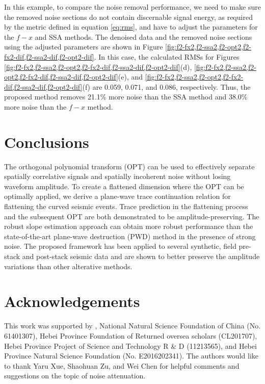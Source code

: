 In this example, to compare the noise removal performance, we need to make sure the removed noise sections do not contain discernable signal energy, as required by the metric defined in equation \ref{eq:rms}, and have to adjust the parameters for the $f-x$ and SSA methods. The denoised data and the removed noise sections using the adjusted parameters are shown in Figure \ref{fig:f2-fx2,f2-ssa2,f2-opt2,f2-fx2-dif,f2-ssa2-dif,f2-opt2-dif}. In this case, the calculated RMSs for Figures \ref{fig:f2-fx2,f2-ssa2,f2-opt2,f2-fx2-dif,f2-ssa2-dif,f2-opt2-dif}(d), \ref{fig:f2-fx2,f2-ssa2,f2-opt2,f2-fx2-dif,f2-ssa2-dif,f2-opt2-dif}(e), and \ref{fig:f2-fx2,f2-ssa2,f2-opt2,f2-fx2-dif,f2-ssa2-dif,f2-opt2-dif}(f) are 0.059, 0.071, and 0.086, respectively. Thus, the proposed method removes 21.1\% more noise than the SSA method and 38.0\% more noise than the $f-x$ method.

\section{Conclusions}
The orthogonal polynomial transform (OPT) can be used to effectively separate spatially correlative signals and spatially incoherent noise without losing waveform amplitude. To create a flattened dimension where the OPT can be optimally applied, we derive a plane-wave trace continuation relation for flattening the curved seismic events. Trace prediction in the flattening process and the subsequent OPT are both demonstrated to be amplitude-preserving. The robust slope estimation approach can obtain more robust performance than the state-of-the-art plane-wave destruction (PWD) method in the presence of strong noise. The proposed framework has been applied to several synthetic, field pre-stack and post-stack seismic data and are shown to better preserve the amplitude variations than other alterative methods.

\section{Acknowledgements}
This work was supported by , National Natural Science Foundation of China (No. 61401307), Hebei Province Foundation of Returned oversea scholars (CL201707), Hebei Province Project of Science and Technology R \& D (11213565), and Hebei Province Natural Science Foundation (No. E2016202341). The authors would like to thank Yaru Xue, Shaohuan Zu, and Wei Chen for helpful comments and suggestions on the topic of noise attenuation.


